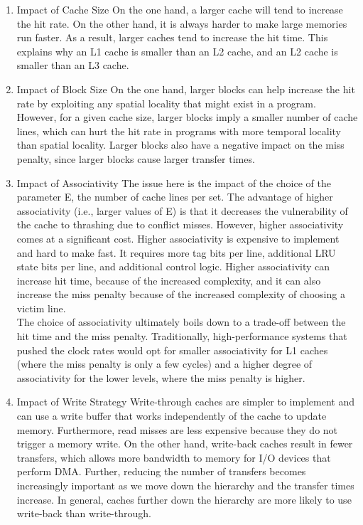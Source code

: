 \documentclass[11pt]{article}
\begin{document}
\begin{enumerate}
\item Impact of Cache Size
\label{sec:org70a8f8b}
On the one hand, a larger cache will tend to increase the hit rate. On the other hand, it is always harder to make large memories run faster. As a result, larger caches tend to increase the hit time. This explains why an L1 cache is smaller than an L2 cache, and an L2 cache is smaller than an L3 cache.\\

\item Impact of Block Size
\label{sec:orgf455bc4}
On the one hand, larger blocks can help increase the hit rate by exploiting any spatial locality that might exist in a program. However, for a given cache size, larger blocks imply a smaller number of cache lines, which can hurt the hit rate in programs with more temporal locality than spatial locality. Larger blocks also have a negative impact on the miss penalty, since larger blocks cause larger transfer times.\\

\item Impact of Associativity
\label{sec:orgec45233}
The issue here is the impact of the choice of the parameter E, the number of cache lines per set. The advantage of higher associativity (i.e., larger values of E) is that it decreases the vulnerability of the cache to thrashing due to conflict misses. However, higher associativity comes at a significant cost. Higher associativity is expensive to implement and hard to make fast. It requires more tag bits per line, additional LRU state bits per line, and additional control logic. Higher associativity can increase hit time, because of the increased complexity, and it can also increase the miss penalty because of the increased complexity of choosing a victim line.\\

The choice of associativity ultimately boils down to a trade-off between the hit time and the miss penalty. Traditionally, high-performance systems that pushed the clock rates would opt for smaller associativity for L1 caches (where the miss penalty is only a few cycles) and a higher degree of associativity for the lower levels, where the miss penalty is higher.\\

\item Impact of Write Strategy
\label{sec:org0b619bc}
Write-through caches are simpler to implement and can use a write buffer that works independently of the cache to update memory. Furthermore, read misses are less expensive because they do not trigger a memory write. On the other hand, write-back caches result in fewer transfers, which allows more bandwidth to memory for I/O devices that perform DMA. Further, reducing the number of transfers becomes increasingly important as we move down the hierarchy and the transfer times increase. In general, caches further down the hierarchy are more likely to use write-back than write-through.\\
\end{enumerate}
\end{document}
